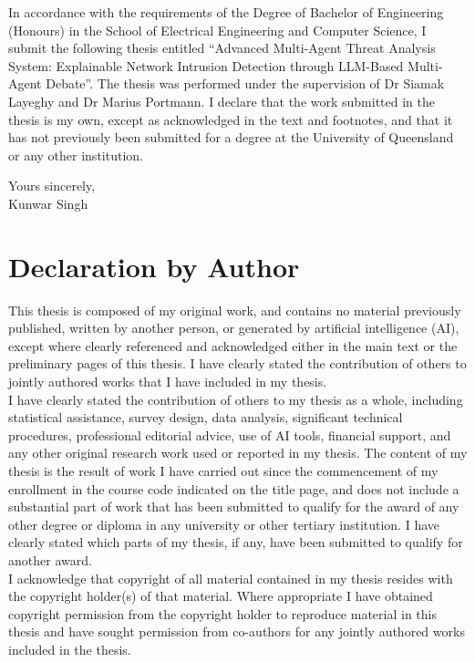 \documentclass[12pt,openany,oneside,a4paper]{book}
\begin{document}
In accordance with the requirements of the Degree of Bachelor of Engineering (Honours) in the School of Electrical Engineering and Computer Science, I submit the following thesis entitled ``Advanced Multi-Agent Threat Analysis System: Explainable Network Intrusion Detection through LLM-Based Multi-Agent Debate''. The thesis was performed under the supervision of Dr Siamak Layeghy and Dr Marius Portmann. I declare that the work submitted in the thesis is my own, except as acknowledged in the text and footnotes, and that it has not previously been submitted for a degree at the University of Queensland or any other institution.

\begin{flushright}
	Yours sincerely,\\
	\vspace{10mm}
	Kunwar Singh
\end{flushright}

\chapter{Declaration by Author}

This thesis is composed of my original work, and contains no material previously published, written by another person, or generated by artificial intelligence (AI), except where clearly referenced and acknowledged either in the main text or the preliminary pages of this thesis. I have clearly stated the contribution of others to jointly authored works that I have included in my thesis.\\

I have clearly stated the contribution of others to my thesis as a whole, including statistical assistance, survey design, data analysis, significant technical procedures, professional editorial advice, use of AI tools, financial support, and any other original research work used or reported in my thesis. The content of my thesis is the result of work I have carried out since the commencement of my enrollment in the course code indicated on the title page, and does not include a substantial part of work that has been submitted to qualify for the award of any other degree or diploma in any university or other tertiary institution. I have clearly stated which parts of my thesis, if any, have been submitted to qualify for another award.\\

I acknowledge that copyright of all material contained in my thesis resides with the copyright holder(s) of that material. Where appropriate I have obtained copyright permission from the copyright holder to reproduce material in this thesis and have sought permission from co-authors for any jointly authored works included in the thesis.
\end{document}
